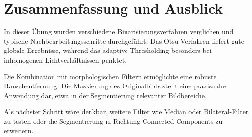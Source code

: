 \documentclass[a4paper, fontsize=10pt, DIV=9, parskip=half, headings=small]{scrartcl}
\begin{document}
\section{Zusammenfassung und Ausblick}

In dieser Übung wurden verschiedene Binarisierungsverfahren verglichen und typische Nachbearbeitungsschritte durchgeführt. Das Otsu-Verfahren liefert gute globale Ergebnisse, während das adaptive Thresholding besonders bei inhomogenen Lichtverhältnissen punktet.

Die Kombination mit morphologischen Filtern ermöglichte eine robuste Rauschentfernung. Die Maskierung des Originalbilds stellt eine praxisnahe Anwendung dar, etwa in der Segmentierung relevanter Bildbereiche.

Als nächster Schritt wäre denkbar, weitere Filter wie Median oder Bilateral-Filter zu testen oder die Segmentierung in Richtung Connected Components zu erweitern.
\end{document}
